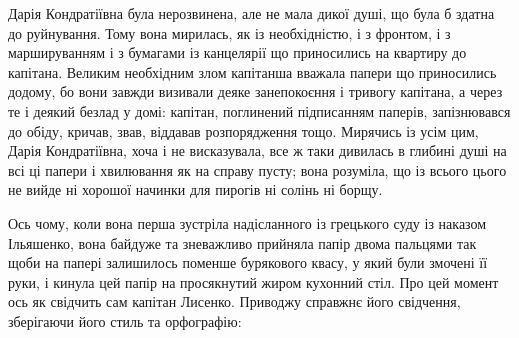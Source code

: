 \documentclass[a4paper,20pt]{report}
\begin{document}
Дарія Кондратіївна була нерозвинена, але не мала дикої душі, що була б здатна
до руйнування.  Тому вона мирилась, як із необхідністю, і з фронтом, і з
маршируванням і з бумагами із канцелярії що приносились на квартиру до
капітана. Великим необхідним злом капітанша вважала папери що приносились
додому, бо вони завжди визивали деяке занепокоєння і тривогу капітана, а через
те і деякий безлад у домі: капітан, поглинений підписанням паперів,
запізнювався до обіду, кричав, звав, віддавав розпорядження тощо.  Мирячись із
усім цим, Дарія Кондратіївна, хоча і не висказувала, все ж таки дивилась в
глибині душі на всі ці папери і хвилювання як на справу пусту; вона розуміла,
що із всього цього не вийде ні хорошої начинки для пирогів ні солінь ні борщу.

Ось чому, коли вона перша зустріла надісланного із грецького суду із наказом Ільяшенко, вона
байдуже та зневажливо прийняла папір двома пальцями так щоби на 
папері залишилось поменше бурякового квасу, у який були змочені її руки, і кинула
цей папір на просякнутий жиром кухонний стіл. Про цей момент ось як свідчить
сам капітан Лисенко. Приводжу справжнє його свідчення, зберігаючи його стиль та
орфографію:
\end{document}
